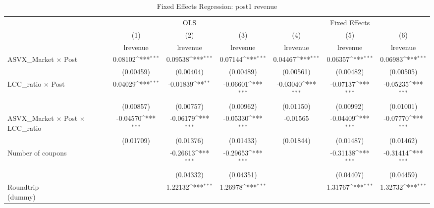 \begin{table}[htbp]\centering
\def\sym#1{\ifmmode^{#1}\else\(^{#1}\)\fi}
\caption{Fixed Effects Regression: post1 revenue}
\begin{tabular}{l*{6}{c}}
\toprule
                    &\multicolumn{3}{c}{OLS}                                          &\multicolumn{3}{c}{Fixed Effects}                                \\\cmidrule(lr){2-4}\cmidrule(lr){5-7}
                    &\multicolumn{1}{c}{(1)}&\multicolumn{1}{c}{(2)}&\multicolumn{1}{c}{(3)}&\multicolumn{1}{c}{(4)}&\multicolumn{1}{c}{(5)}&\multicolumn{1}{c}{(6)}\\
                    &\multicolumn{1}{c}{lrevenue}&\multicolumn{1}{c}{lrevenue}&\multicolumn{1}{c}{lrevenue}&\multicolumn{1}{c}{lrevenue}&\multicolumn{1}{c}{lrevenue}&\multicolumn{1}{c}{lrevenue}\\
\midrule
ASVX\_Market $\times$ Post&     0.08102\sym{***}&     0.09538\sym{***}&     0.07144\sym{***}&     0.04467\sym{***}&     0.06357\sym{***}&     0.06983\sym{***}\\
                    &   (0.00459)         &   (0.00404)         &   (0.00489)         &   (0.00561)         &   (0.00482)         &   (0.00505)         \\
\addlinespace
LCC\_ratio $\times$ Post&     0.04029\sym{***}&    -0.01839\sym{**} &    -0.06601\sym{***}&    -0.03040\sym{***}&    -0.07137\sym{***}&    -0.05235\sym{***}\\
                    &   (0.00857)         &   (0.00757)         &   (0.00962)         &   (0.01150)         &   (0.00992)         &   (0.01001)         \\
\addlinespace
ASVX\_Market $\times$ Post $\times$ LCC\_ratio&    -0.04570\sym{***}&    -0.06179\sym{***}&    -0.05330\sym{***}&    -0.01565         &    -0.04409\sym{***}&    -0.07770\sym{***}\\
                    &   (0.01709)         &   (0.01376)         &   (0.01433)         &   (0.01844)         &   (0.01487)         &   (0.01462)         \\
\addlinespace
Number of coupons   &                     &    -0.26613\sym{***}&    -0.29653\sym{***}&                     &    -0.31138\sym{***}&    -0.31414\sym{***}\\
                    &                     &   (0.04332)         &   (0.04351)         &                     &   (0.04407)         &   (0.04459)         \\
\addlinespace
\shortstack{Roundtrip \\ (dummy)}&                     &     1.22132\sym{***}&     1.26978\sym{***}&                     &     1.31767\sym{***}&     1.32732\sym{***}\\

\end{tabular}
\end{table}
